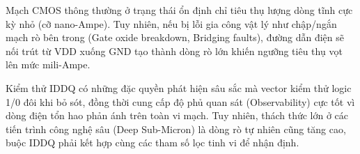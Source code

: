 Mạch CMOS thông thường ở trạng thái ổn định chỉ tiêu thụ lượng dòng tĩnh cực kỳ nhỏ (cỡ nano-Ampe). Tuy nhiên, nếu bị lỗi gia công vật lý như chập/ngắn mạch rò bên trong (Gate oxide breakdown, Bridging faults), đường dẫn điện sẽ nối trút từ VDD xuống GND tạo thành dòng rò lớn khiến ngưỡng tiêu thụ vọt lên mức mili-Ampe.

Kiểm thử IDDQ có những đặc quyền phát hiện sâu sắc mà vector kiểm thử logic 1/0 đôi khi bỏ sót, đồng thời cung cấp độ phủ quan sát (Observability) cực tốt vì dòng điện tổn hao phản ánh trên toàn vi mạch. Tuy nhiên, thách thức lớn ở các tiến trình công nghệ sâu (Deep Sub-Micron) là dòng rò tự nhiên cũng tăng cao, buộc IDDQ phải kết hợp cùng các tham số lọc tinh vi để nhận định.
